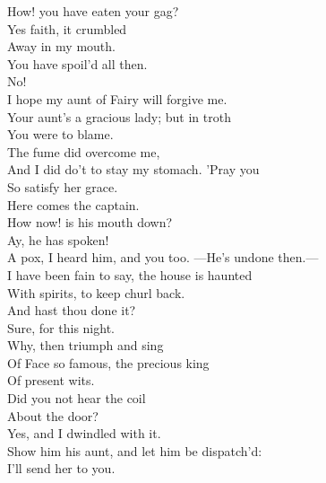 \documentclass[a4paper,oneside]{memoir}
\begin{document}
\begin{drama*}
\subtlespeaks How! you have eaten your gag?\\
\dapperspeaks {} Yes faith, it crumbled\\
Away in my mouth.\\
\subtlespeaks {} You have spoil'd all then.\\
\dapperspeaks {} No!\\
I hope my aunt of Fairy will forgive me.\\
\subtlespeaks Your aunt's a gracious lady; but in troth\\
You were to blame.\\
\dapperspeaks {} The fume did overcome me,\\
And I did do't to stay my stomach. 'Pray you\\
So satisfy her grace.\\
 Here comes the captain.\\
\facespeaks How now! is his mouth down?\\
\subtlespeaks {} Ay, he has spoken!\\
\facespeaks A pox, I heard him, and you too. ---He's undone then.---\\
I have been fain to say, the house is haunted\\
With spirits, to keep churl back.\\
\subtlespeaks {} And hast thou done it?\\
\facespeaks Sure, for this night.\\
\subtlespeaks {} Why, then triumph and sing\\
Of Face so famous, the precious king\\
Of present wits.\\
\facespeaks {} Did you not hear the coil\\
About the door?\\
\subtlespeaks {} Yes, and I dwindled with it.\\
\facespeaks Show him his aunt, and let him be dispatch'd:\\
I'll send her to you.\\

\end{drama*}
\end{document}
